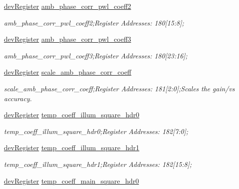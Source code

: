 \begin{DoxyCompactItemize}
\mbox{\hyperlink{classdev_register}{dev\+Register}} \mbox{\hyperlink{class_o_p_t3101_registers_a229cd5ba8dde1ba7c06e2484b334adfa}{amb\+\_\+phase\+\_\+corr\+\_\+pwl\+\_\+coeff2}}
\begin{DoxyCompactList}\small\item\em amb\+\_\+phase\+\_\+corr\+\_\+pwl\+\_\+coeff2;Register Addresses\+: 180\mbox{[}15\+:8\mbox{]}; \end{DoxyCompactList}\item 
\mbox{\hyperlink{classdev_register}{dev\+Register}} \mbox{\hyperlink{class_o_p_t3101_registers_a8476fd27110ea68c00fcd3f8d31a2fc9}{amb\+\_\+phase\+\_\+corr\+\_\+pwl\+\_\+coeff3}}
\begin{DoxyCompactList}\small\item\em amb\+\_\+phase\+\_\+corr\+\_\+pwl\+\_\+coeff3;Register Addresses\+: 180\mbox{[}23\+:16\mbox{]}; \end{DoxyCompactList}\item 
\mbox{\hyperlink{classdev_register}{dev\+Register}} \mbox{\hyperlink{class_o_p_t3101_registers_a07ebab270e16f433cb52e2f164892bd2}{scale\+\_\+amb\+\_\+phase\+\_\+corr\+\_\+coeff}}
\begin{DoxyCompactList}\small\item\em scale\+\_\+amb\+\_\+phase\+\_\+corr\+\_\+coeff;Register Addresses\+: 181\mbox{[}2\+:0\mbox{]};Scales the gain/vs accuracy. \end{DoxyCompactList}\item 
\mbox{\hyperlink{classdev_register}{dev\+Register}} \mbox{\hyperlink{class_o_p_t3101_registers_a542e0507dc7ade4ef88e2f4f98b8cbf0}{temp\+\_\+coeff\+\_\+illum\+\_\+square\+\_\+hdr0}}
\begin{DoxyCompactList}\small\item\em temp\+\_\+coeff\+\_\+illum\+\_\+square\+\_\+hdr0;Register Addresses\+: 182\mbox{[}7\+:0\mbox{]}; \end{DoxyCompactList}\item 
\mbox{\hyperlink{classdev_register}{dev\+Register}} \mbox{\hyperlink{class_o_p_t3101_registers_a8bde837cb93f705f5b5a8bee6fba8443}{temp\+\_\+coeff\+\_\+illum\+\_\+square\+\_\+hdr1}}
\begin{DoxyCompactList}\small\item\em temp\+\_\+coeff\+\_\+illum\+\_\+square\+\_\+hdr1;Register Addresses\+: 182\mbox{[}15\+:8\mbox{]}; \end{DoxyCompactList}\item 
\mbox{\hyperlink{classdev_register}{dev\+Register}} \mbox{\hyperlink{class_o_p_t3101_registers_a845d9aca63dbbafaf894b0c88e84624b}{temp\+\_\+coeff\+\_\+main\+\_\+square\+\_\+hdr0}}

\end{DoxyCompactItemize}

